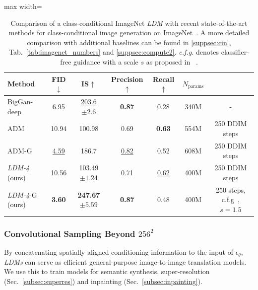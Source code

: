 \begin{table}[htbp]
\centering
\begin{footnotesize}
\begin{adjustbox}{max width=\linewidth}
\footnotesize
\begin{tabular}{lcccccc}
\toprule
\textbf{Method} & FID$\downarrow$ & IS$\uparrow$ & Precision$\uparrow$ & Recall$\uparrow$ & $N_{\text{params}}$ & \\
\midrule

BigGan-deep~\cite{bigganbrock}& 6.95 & \underline{203.6\tiny$\pm\text{2.6}$} & \textbf{0.87} & 0.28  & 340M & - \\
ADM~\cite{DBLP:journals/corr/abs-2105-05233} & 10.94 & 100.98& 0.69 & \textbf{0.63}  & 554M & 250 DDIM steps\\
ADM-G~\cite{DBLP:journals/corr/abs-2105-05233} & \underline{4.59}  & 186.7& \underline{0.82} & 0.52 & 608M & 250 DDIM steps \\
\midrule
\emph{LDM-4} (ours) & 10.56 & 103.49\tiny$\pm\text{1.24}$  & 0.71  & \underline{0.62} & 400M & 250 DDIM steps\\
\emph{LDM-4}-G (ours) & \textbf{3.60} & \textbf{247.67\tiny$\pm\text{5.59}$}  & \textbf{0.87}  & 0.48 & 400M & 250 steps, c.f.g~\cite{ho2021classifier}, $s=1.5$\\

\bottomrule
\end{tabular}
\end{adjustbox}
\end{footnotesize}
\caption{\label{tab:imagenet_main_numbers} Comparison of a class-conditional ImageNet \emph{LDM} with recent state-of-the-art methods for class-conditional image generation on ImageNet~\cite{DBLP:conf/cvpr/DengDSLL009}. A more detailed comparison with additional baselines can be found in \ref{suppsec:cin}, Tab.~\ref{tab:imagenet_numbers} and \ref{suppsec:compute2}. \emph{c.f.g.} denotes classifier-free guidance with a scale $s$ as proposed in ~\cite{ho2021classifier}.}
\end{table}

\subsubsection{Convolutional Sampling Beyond $256^2$}
\label{subsubsec:beyond}

By concatenating spatially aligned conditioning information to the input of
$\epsilon_\theta$, \emph{LDMs} can serve as efficient general-purpose image-to-image translation models. We use this to train models for semantic synthesis, super-resolution (Sec.~\ref{subsec:superres}) and inpainting (Sec.~\ref{subsec:inpainting}).

